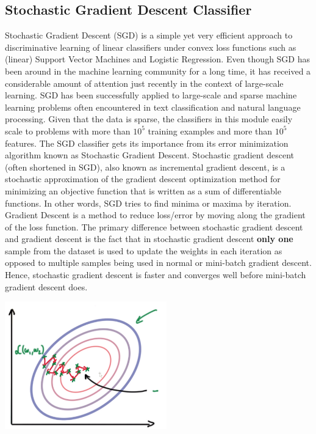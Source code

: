 \documentclass[12pt]{article}
\begin{document}
		\subsection{Stochastic Gradient Descent Classifier}
		\textnormal{Stochastic Gradient Descent (SGD) is a simple yet very efficient approach to discriminative learning of linear classifiers under convex loss functions such as (linear) Support Vector Machines and Logistic Regression. Even though SGD has been around in the machine learning community for a long time, it has received a considerable amount of attention just recently in the context of large-scale learning.}
		\textnormal{SGD has been successfully applied to large-scale and sparse machine learning problems often encountered in text classification and natural language processing. Given that the data is sparse, the classifiers in this module easily scale to problems with more than $ 10^5 $ training examples and more than $ 10^5 $ features.}
		\textnormal{The SGD classifier gets its importance from its error minimization algorithm known as Stochastic Gradient Descent. Stochastic gradient descent (often shortened in SGD), also known as incremental gradient descent, is a stochastic approximation of the gradient descent optimization method for minimizing an objective function that is written as a sum of differentiable functions. In other words, SGD tries to find minima or maxima by iteration. Gradient Descent is a method to reduce loss/error by moving along the gradient of the loss function. The primary difference between stochastic gradient descent and gradient descent is the fact that in stochastic gradient descent \textbf{only one} sample from the dataset is used to update the weights in each iteration as opposed to multiple samples being used in normal or mini-batch gradient descent. Hence, stochastic gradient descent is faster and converges well before mini-batch gradient descent does.}
		\begin{center}
			\includegraphics[width=7cm]{sgd}
		\end{center}
		
\end{document}

